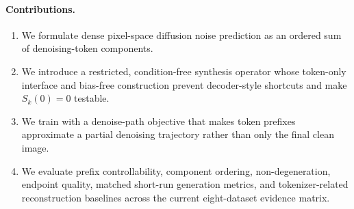 \paragraph{Contributions.}
\begin{enumerate}
  \item We formulate dense pixel-space diffusion noise prediction as an ordered
  sum of denoising-token components.
  \item We introduce a restricted, condition-free synthesis operator whose
  token-only interface and bias-free construction prevent decoder-style
  shortcuts and make $S_k(0)=0$ testable.
  \item We train \method{} with a denoise-path objective that makes token
  prefixes approximate a partial denoising trajectory rather than only the final
  clean image.
  \item We evaluate prefix controllability, component ordering,
  non-degeneration, endpoint quality, matched short-run generation metrics, and
  tokenizer-related reconstruction baselines across the current eight-dataset
  evidence matrix.
\end{enumerate}
